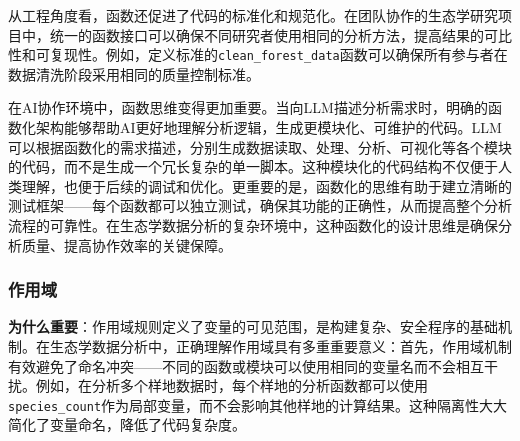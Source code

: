 \documentclass[
]{book}
\newenvironment{Shaded}{\begin{snugshade}}{\end{snugshade}}
\newcommand{\CommentTok}[1]{\textcolor[rgb]{0.56,0.35,0.01}{\textit{#1}}}
\newcommand{\ControlFlowTok}[1]{\textcolor[rgb]{0.13,0.29,0.53}{\textbf{#1}}}
\newcommand{\DecValTok}[1]{\textcolor[rgb]{0.00,0.00,0.81}{#1}}
\newcommand{\FunctionTok}[1]{\textcolor[rgb]{0.13,0.29,0.53}{\textbf{#1}}}
\newcommand{\NormalTok}[1]{#1}
\newcommand{\OtherTok}[1]{\textcolor[rgb]{0.56,0.35,0.01}{#1}}
\newcommand{\SpecialCharTok}[1]{\textcolor[rgb]{0.81,0.36,0.00}{\textbf{#1}}}
\begin{document}
从工程角度看，函数还促进了代码的标准化和规范化。在团队协作的生态学研究项目中，统一的函数接口可以确保不同研究者使用相同的分析方法，提高结果的可比性和可复现性。例如，定义标准的\texttt{clean\_forest\_data}函数可以确保所有参与者在数据清洗阶段采用相同的质量控制标准。

在AI协作环境中，函数思维变得更加重要。当向LLM描述分析需求时，明确的函数化架构能够帮助AI更好地理解分析逻辑，生成更模块化、可维护的代码。LLM可以根据函数化的需求描述，分别生成数据读取、处理、分析、可视化等各个模块的代码，而不是生成一个冗长复杂的单一脚本。这种模块化的代码结构不仅便于人类理解，也便于后续的调试和优化。更重要的是，函数化的思维有助于建立清晰的测试框架------每个函数都可以独立测试，确保其功能的正确性，从而提高整个分析流程的可靠性。在生态学数据分析的复杂环境中，这种函数化的设计思维是确保分析质量、提高协作效率的关键保障。

\hypertarget{ux4f5cux7528ux57df}{%
\subsubsection{作用域}\label{ux4f5cux7528ux57df}}

\begin{Shaded}
\end{Shaded}

\textbf{为什么重要}：作用域规则定义了变量的可见范围，是构建复杂、安全程序的基础机制。在生态学数据分析中，正确理解作用域具有多重重要意义：首先，作用域机制有效避免了命名冲突------不同的函数或模块可以使用相同的变量名而不会相互干扰。例如，在分析多个样地数据时，每个样地的分析函数都可以使用\texttt{species\_count}作为局部变量，而不会影响其他样地的计算结果。这种隔离性大大简化了变量命名，降低了代码复杂度。
\end{document}
